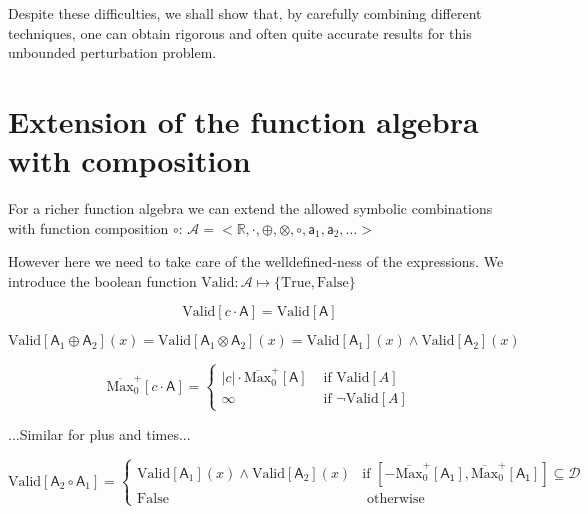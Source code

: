 \documentclass{article}
\theoremstyle{definition}
\begin{document}
Despite these difficulties, we shall show that, by carefully combining
different techniques, one can obtain rigorous and often quite accurate
results for this unbounded perturbation problem.






\newpage

\appendix

\section{Extension of the function algebra with composition}

For a richer function algebra we can extend the allowed symbolic combinations with function composition $\circ$:
$\mathcal{A}=<\mathbb{R},\cdot,\oplus,\otimes,\circ,\mathsf{a}_1,\mathsf{a}_2,\dots>$

However here we need to take care of the welldefined-ness of the expressions. We introduce the boolean function $\text{Valid} : \mathcal{A} \mapsto \{\text{True},\text{False}\}$

\begin{equation}
    \text{Valid}[c \cdot \mathsf{A}] = \text{Valid}[\mathsf{A}]
\end{equation}

\begin{equation}
    \text{Valid}[\mathsf{A}_1 \oplus \mathsf{A}_2](x)
    =
    \text{Valid}[\mathsf{A}_1 \otimes \mathsf{A}_2](x)
    =
    \text{Valid}[\mathsf{A}_1](x) 
    \wedge
    \text{Valid}[\mathsf{A}_2](x) 
\end{equation}

\begin{equation}
    \overline{\text{Max}}^+_0[c \cdot \mathsf{A}]
    =
    \begin{cases}
        |c| \cdot \overline{\text{Max}}^+_0[\mathsf{A}] &\text{ if $\text{Valid}[A]$} \\
        \infty &\text{ if $\lnot \text{Valid}[A]$}
    \end{cases}
\end{equation}

...Similar for plus and times...

\begin{equation}
    \text{Valid}[\mathsf{A}_2 \circ \mathsf{A}_1]
    =
    \begin{cases}
        \text{Valid}[\mathsf{A}_1](x) 
    \wedge
    \text{Valid}[\mathsf{A}_2](x)  &\text{if } [-\overline{\text{Max}}^+_0[\mathsf{A_1}],\overline{\text{Max}}^+_0[\mathsf{A_1}]] \subseteq \mathcal{D} \\
        \text{False} &\text{ otherwise }
    \end{cases}
\end{equation}
\end{document}
